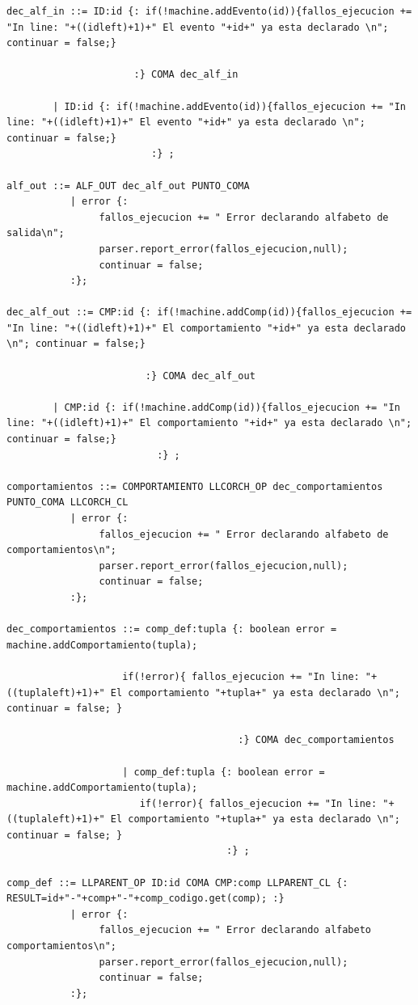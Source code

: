 \documentclass[12pt,a4paper]{article}
\begin{document}
\begin{lstlisting}[caption=Analizador Sintáctico y Semántico en CUP]
dec_alf_in ::= ID:id {: if(!machine.addEvento(id)){fallos_ejecucion += "In line: "+((idleft)+1)+" El evento "+id+" ya esta declarado \n"; continuar = false;} 

                      :} COMA dec_alf_in

		| ID:id {: if(!machine.addEvento(id)){fallos_ejecucion += "In line: "+((idleft)+1)+" El evento "+id+" ya esta declarado \n"; continuar = false;} 
                         :} ;

alf_out ::= ALF_OUT dec_alf_out PUNTO_COMA 
		   | error {:
				fallos_ejecucion += " Error declarando alfabeto de salida\n";
				parser.report_error(fallos_ejecucion,null);
				continuar = false;
		   :};

dec_alf_out ::= CMP:id {: if(!machine.addComp(id)){fallos_ejecucion += "In line: "+((idleft)+1)+" El comportamiento "+id+" ya esta declarado \n"; continuar = false;} 

                        :} COMA dec_alf_out

		| CMP:id {: if(!machine.addComp(id)){fallos_ejecucion += "In line: "+((idleft)+1)+" El comportamiento "+id+" ya esta declarado \n"; continuar = false;} 
                          :} ;

comportamientos ::= COMPORTAMIENTO LLCORCH_OP dec_comportamientos PUNTO_COMA LLCORCH_CL 
		   | error {:
				fallos_ejecucion += " Error declarando alfabeto de comportamientos\n";
				parser.report_error(fallos_ejecucion,null);
				continuar = false;
		   :};

dec_comportamientos ::= comp_def:tupla {: boolean error = machine.addComportamiento(tupla);

                    if(!error){ fallos_ejecucion += "In line: "+((tuplaleft)+1)+" El comportamiento "+tupla+" ya esta declarado \n"; continuar = false; }

                                        :} COMA dec_comportamientos 

                    | comp_def:tupla {: boolean error = machine.addComportamiento(tupla);
                       if(!error){ fallos_ejecucion += "In line: "+((tuplaleft)+1)+" El comportamiento "+tupla+" ya esta declarado \n"; continuar = false; }
                                      :} ;

comp_def ::= LLPARENT_OP ID:id COMA CMP:comp LLPARENT_CL {: RESULT=id+"-"+comp+"-"+comp_codigo.get(comp); :}
		   | error {:
				fallos_ejecucion += " Error declarando alfabeto comportamientos\n";
				parser.report_error(fallos_ejecucion,null);
				continuar = false;
		   :};


\end{lstlisting}
\end{document}
